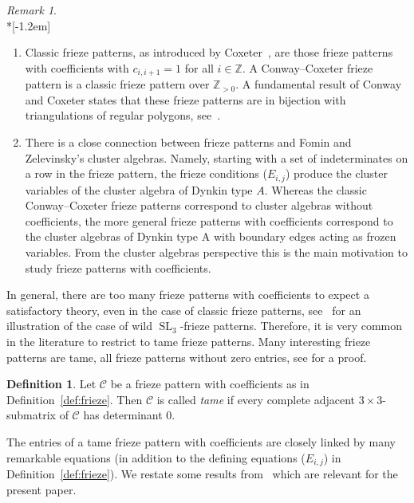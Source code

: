 \documentclass[10pt]{amsart}
\numberwithin{equation}{section}
\theoremstyle{definition}
\newtheorem{defi}[theo]{Definition}
\theoremstyle{remark}
\newtheorem{rema}[theo]{Remark}
\DeclareMathOperator{\SL}{SL}
\begin{document}
\begin{rema}\ \\*[-1.2em]
\begin{enumerate}
 \item Classic frieze patterns, as introduced by Coxeter~\cite{Cox71}, 
are those frieze patterns with coefficients with $c_{i,i+1}=1$ for all $i\in \mathbb{Z}$.
A Conway--Coxeter frieze pattern is a classic frieze pattern over $\mathbb{Z}_{> 0}$. 
A fundamental result of Conway and Coxeter states that these frieze patterns are in bijection with triangulations of regular polygons, see~\cite{CC73}. 
\item There is a close connection between frieze patterns and Fomin and
Zelevinsky's cluster algebras. Namely, 
starting with a set of indeterminates on a row in the frieze pattern,
the frieze conditions ($E_{i,j}$) produce the cluster variables of the
cluster algebra of Dynkin type $A$. Whereas the classic Conway--Coxeter frieze
patterns correspond to cluster algebras without coefficients, the more general
frieze patterns with coefficients correspond to the cluster algebras of 
Dynkin type A with boundary edges acting as frozen variables.
From the cluster algebras perspective this is the main motivation to study 
frieze patterns with coefficients.
\end{enumerate}
\end{rema}


In general, there are too many frieze patterns
with coefficients to expect a satisfactory theory, even in the case of classic frieze 
patterns,
see~\cite[Section~3]{Cuntz-wild} for an illustration of the case of wild $\SL_3$-frieze patterns. Therefore, it is very common in the literature to
restrict to tame frieze patterns. Many interesting frieze patterns 
are tame, \eg all frieze patterns without zero entries, see 
\cite[Proposition~2.4]{CHJ} for a proof. 


\begin{defi} \label{def:tame}
Let $\mathcal{C}$ be a frieze pattern with coefficients as in Definition~\ref{def:frieze}.
Then $\mathcal{C}$ is called {\em tame} if every complete adjacent $3\times 3$-submatrix of 
$\mathcal{C}$ has determinant 0.
\end{defi}


The entries of a tame frieze pattern with coefficients are closely linked
by many remarkable equations (in addition to the defining equations ($E_{i,j}$)
in Definition~\ref{def:frieze}). We restate some results from~\cite{CHJ}
which are relevant for the present paper.
\end{document}
